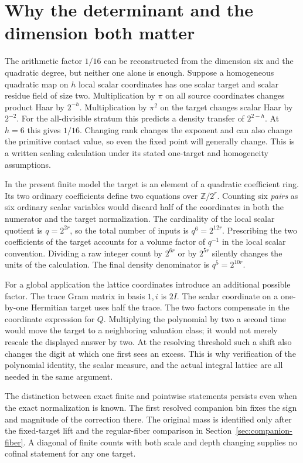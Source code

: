 \documentclass[12pt,letterpaper]{article}
\begin{document}
\section{Why the determinant and the dimension both matter}
The arithmetic factor $1/16$ can be reconstructed from the dimension six and the quadratic degree, but neither one alone is enough. Suppose a homogeneous quadratic map on $h$ local scalar coordinates has one scalar target and scalar residue field of size two. Multiplication by $\pi$ on all source coordinates changes product Haar by $2^{-h}$. Multiplication by $\pi^2$ on the target changes scalar Haar by $2^{-2}$. For the all-divisible stratum this predicts a density transfer of $2^{2-h}$. At $h=6$ this gives $1/16$. Changing rank changes the exponent and can also change the primitive contact value, so even the fixed point will generally change. This is a written scaling calculation under its stated one-target and homogeneity assumptions.

In the present finite model the target is an element of a quadratic coefficient ring. Its two ordinary coefficients define two equations over $\mathbb Z/2^r$. Counting six \emph{pairs} as six ordinary scalar variables would discard half of the coordinates in both the numerator and the target normalization. The cardinality of the local scalar quotient is $q=2^{2r}$, so the total number of inputs is $q^6=2^{12r}$. Prescribing the two coefficients of the target accounts for a volume factor of $q^{-1}$ in the local scalar convention. Dividing a raw integer count by $2^{6r}$ or by $2^{5r}$ silently changes the units of the calculation. The final density denominator is $q^5=2^{10r}$.

For a global application the lattice coordinates introduce an additional possible factor. The trace Gram matrix in basis $1,i$ is $2I$. The scalar coordinate on a one-by-one Hermitian target uses half the trace. The two factors compensate in the coordinate expression for $Q$. Multiplying the polynomial by two a second time would move the target to a neighboring valuation class; it would not merely rescale the displayed answer by two. At the resolving threshold such a shift also changes the digit at which one first sees an excess. This is why verification of the polynomial identity, the scalar measure, and the actual integral lattice are all needed in the same argument.

The distinction between exact finite and pointwise statements persists even when the exact normalization is known. The first resolved companion bin fixes the sign and magnitude of the correction there. The original mass is identified only after the fixed-target lift and the regular-fiber comparison in Section~\ref{sec:companion-fiber}. A diagonal of finite counts with both scale and depth changing supplies no cofinal statement for any one target.
\end{document}
